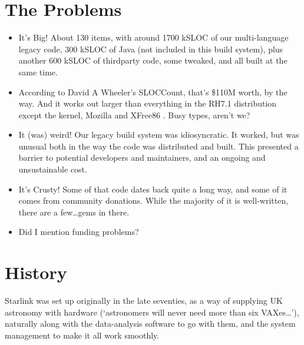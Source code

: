 \documentclass[11pt,twoside]{article}
\begin{document}
\section{The Problems}

\begin{itemize}
\item It's Big!  About 130 items, with around 1700 kSLOC of our
  multi-language legacy code, 300 kSLOC of Java (not included in
  this build system), plus another 600 kSLOC of thirdparty code, some
  tweaked, and all built at the same time.

\item According to David A Wheeler's SLOCCount,
  that's \$110M worth, by the way.  And it works out larger than
  everything in the RH7.1 distribution except the kernel, Mozilla and XFree86
  .
  Busy types, aren't we?

\item It (was) weird!  Our legacy build system was idiosyncratic.  It
  worked, but was unusual both in the way the code was distributed and
  built.  This presented a barrier to potential developers and
  maintainers, and an ongoing and unsustainable cost.

\item It's Crusty!  Some of that code dates back quite a long way, and
  some of it comes from community donations.  While the majority of it
  is well-written, there are a few\dots gems in there.


\item Did I mention funding problems?

\end{itemize}

\section{History}


Starlink was set up originally in the late seventies, as a way of
supplying UK astronomy with hardware (`astronomers will never need
more than six VAXes\dots'), naturally along with the data-analysis
software to go with them, and the system management to make it all
work smoothly.
\end{document}
